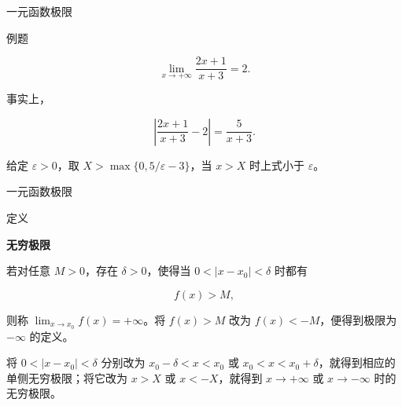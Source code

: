 \documentclass[aspectratio=169,10pt,fontset=fandol]{ctexbeamer}
\newenvironment{warning}{\par\noindent\textbf{注：}\quad}{\par\vspace{0.8em}}
\begin{document}
\begin{frame}[t,fragile]{一元函数极限}
\normalsize
\begin{block}{例题}
{\normalsize
\[

\lim_{x\to+\infty}\frac{2x+1}{x+3}=2.

\]

事实上，

\[

\left|\frac{2x+1}{x+3}-2\right|=\frac5{x+3}.

\]

给定 \(\varepsilon>0\)，取 \(X>\max\{0,5/\varepsilon-3\}\)，当 \(x>X\) 时上式小于 \(\varepsilon\)。


}
\end{block}
\end{frame}
\begin{frame}[t,fragile]{一元函数极限}
\normalsize
\begin{block}{定义}
{\normalsize
\textbf{无穷极限}\par


若对任意 \(M>0\)，存在 \(\delta>0\)，使得当 \(0<|x-x_0|<\delta\) 时都有

\[

f(x)>M,

\]

则称 \(\lim_{x\to x_0}f(x)=+\infty\)。将 \(f(x)>M\) 改为 \(f(x)<-M\)，便得到极限为 \(-\infty\) 的定义。



将 \(0<|x-x_0|<\delta\) 分别改为 \(x_0-\delta<x<x_0\) 或 \(x_0<x<x_0+\delta\)，就得到相应的单侧无穷极限；将它改为 \(x>X\) 或 \(x<-X\)，就得到 \(x\to+\infty\) 或 \(x\to-\infty\) 时的无穷极限。


}
\end{block}
\end{frame}
\end{document}
